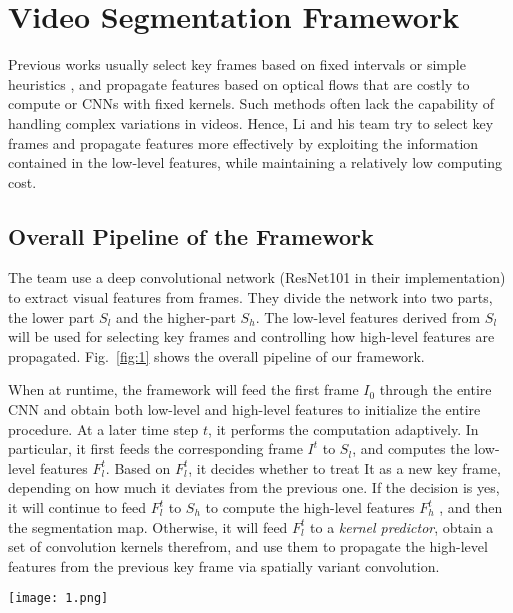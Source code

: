 \documentclass[10pt,twocolumn,letterpaper]{article}
\begin{document}
\section{Video Segmentation Framework}

Previous works usually select key frames based on fixed intervals \cite{Zhu2017Deep} or simple heuristics \cite{shelhamer2016clockwork}, and propagate features based on optical flows that are costly to compute or CNNs with fixed kernels. Such methods often lack the capability of handling complex variations in videos. Hence, Li and his team try to select key frames and propagate features more effectively by exploiting the information contained in the low-level features, while maintaining a relatively low computing cost. 

\subsection{Overall Pipeline of the Framework}

The team use a deep convolutional network (ResNet101 \cite{he2016deep} in their implementation) to extract visual features from frames. They divide the network into two parts, the lower part $S_l$ and the higher-part $S_h$. The low-level features derived from $S_l$ will be used for selecting key frames and controlling how high-level features are propagated. Fig.~\ref{fig:1} shows the overall pipeline of our framework.

When at runtime, the framework will feed the first frame $I_0$ through the entire CNN and obtain both low-level and high-level features to initialize the entire procedure. At a later time step $t$, it performs the computation adaptively. In particular, it first feeds the corresponding frame $I^t$ to $S_l$, and computes the low-level features $F_l^t$. Based on $F_l^t$, it decides whether to treat It as a new key frame, depending on how much it deviates from the previous one. If the decision is yes, it will continue to feed $F_l^t$ to $S_h$ to compute the high-level features $F_h^t$ , and then the segmentation map. Otherwise, it will feed $F_l^t$ to a \emph{kernel predictor}, obtain a set of convolution kernels therefrom, and use them to propagate the high-level features from the previous key frame via spatially variant convolution.

\begin{figure*}
	\begin{center}
		\texttt{[image: 1.png]}
	\end{center}
	\caption{The overall pipeline. At each time step $t$, the lower-part of the CNN $S_l$ first computes the low-level features $F_l^t$. Based on both $F_l^k$ (the low-level features of the previous key frame) and $F_l^t$, the framework will decide whether to set $I^t$ as a new key frame. If yes, the high-level features $F_h^t$ will be computed based on the expensive higher-part $S_h$; otherwise, they will be derived by propagating from $F_h^k$ using spatially variant convolution. The high-level features, obtained in either way, will be used in predicting semantic labels.}
	\label{fig:1}
\end{figure*}
\end{document}

